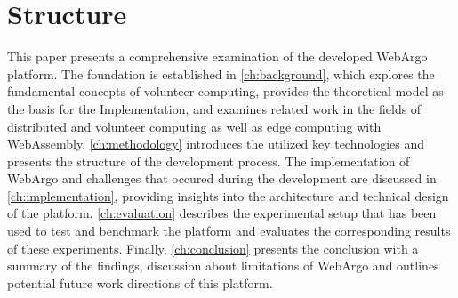 \section{Structure}
\label{sec:intro:structure}
This paper presents a comprehensive examination of the developed WebArgo platform. The foundation is established in \autoref{ch:background}, which explores the fundamental concepts of volunteer computing, provides the theoretical model as the basis for the Implementation, and examines related work in the fields of distributed and volunteer computing as well as edge computing with WebAssembly. \autoref{ch:methodology} introduces the utilized key technologies and presents the structure of the development process. The implementation of WebArgo and challenges that occured during the development are discussed in \autoref{ch:implementation}, providing insights into the architecture and technical design of the platform. \autoref{ch:evaluation} describes the experimental setup that has been used to test and benchmark the platform and evaluates the corresponding results of these experiments. Finally, \autoref{ch:conclusion} presents the conclusion with a summary of the findings, discussion about limitations of WebArgo and outlines potential future work directions of this platform.
